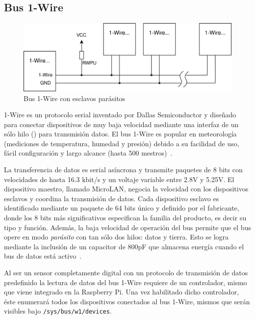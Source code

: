 %
%


\subsection{Bus 1-Wire}%
\label{sec:intro-1wire}

\begin{figure}
	\centering
	\includegraphics[width=0.3\columnwidth]{img/1-Wire.png}
	\caption{Bus 1-Wire con esclavos parásitos}%
	\label{fig:1wire-bus}
\end{figure}
1-Wire es un protocolo serial inventado por Dallas Semiconductor y diseñado para conectar dispositivos de muy baja velocidad mediante una interfaz de un sólo hilo () para transmisión datos.
El bus 1-Wire es popular en meteorología (mediciones de temperatura, humedad y presión) debido a su facilidad de uso, fácil configuración y largo alcance (hasta 500 mestros)~.

La transferencia de datos es serial asíncrona y transmite paquetes de 8 bits con velocidades de hasta 16.3 kbit/s y un voltaje variable entre 2.8V y 5.25V.
El dispositivo maestro, llamado MicroLAN, negocia la velocidad con los dispositivos esclavos y coordina la transmisión de datos.
Cada dispositivo esclavo es identificado mediante un paquete de 64 bits único y definido por el fabricante, donde los 8 bits más significativos especifican la familia del producto, es decir su tipo y función.
Además, la baja velocidad de operación del bus permite que el bus opere en modo \emph{parásito} con tan sólo dos hilos: datos y tierra. Esto se logra mediante la inclusión de un capacitor de 800pF que almacena energía cuando el bus de datos está activo~.

Al ser un sensor completamente digital con un protocolo de transmisión de datos predefinido la lectura de datos del bus 1-Wire requiere de un controlador, mismo que viene integrado en la Raspberry Pi.
Una vez habilitado dicho controlador, éste enumerará todos los dispositivos conectados al bus 1-Wire, mismos que serán visibles bajo \texttt{/sys/bus/w1/devices}.
